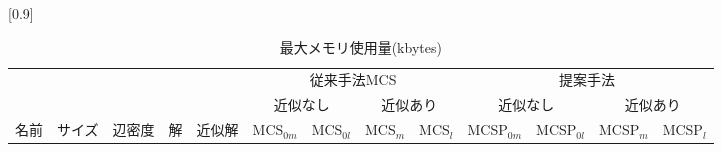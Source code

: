 \begin{table}
\centering
    \caption{最大メモリ使用量(kbytes)}
    \label{tab:result_mem}
\scalebox{0.9}[0.9]{ %
\scriptsize
\begin{tabular}{|l|r|r|r|r|r|r|r|r||r|r|r|r|}
\hline
	  \multicolumn{5}{|c|}{ \multirow{2}{*}{入力グラフデータ} }
	& \multicolumn{4}{c||}{従来手法MCS} & \multicolumn{4}{c|}{提案手法}\\ \cline{6-13} 
	 \multicolumn{5}{|c|}{} & \multicolumn{2}{c|}{近似なし} & \multicolumn{2}{c||}{近似あり} & \multicolumn{2}{c|}{近似なし} & \multicolumn{2}{c|}{近似あり} \\ \hline
    \multicolumn{1}{|l|}{名前} & \multicolumn{1}{l|}{サイズ} & \multicolumn{1}{c|}{辺密度}& \multicolumn{1}{c|}{解} &\multicolumn{1}{l|}{近似解}& MCS$_{0m}$ & MCS$_{0l}$ & MCS$_m$ & MCS$_l$ & MCSP$_{0m}$ & MCSP$_{0l}$ & MCSP$_m$ & MCSP$_l$\\ \hline
	

\end{tabular}}
\end{table}
